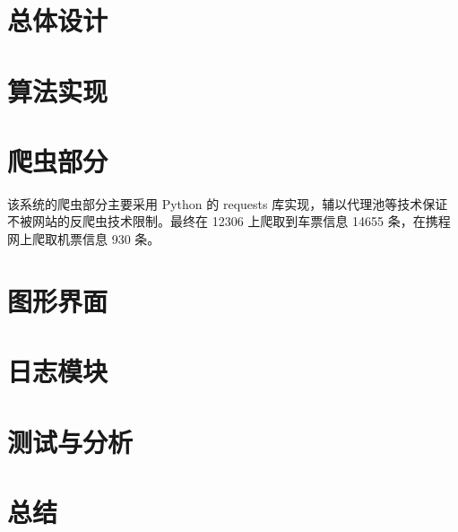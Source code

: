 \documentclass[blue]{elegantbook}
\begin{document}
\chapter{总体设计}

\chapter{算法实现}

\chapter{爬虫部分}
该系统的爬虫部分主要采用 Python 的 requests 库实现，辅以代理池等技术保证不被网站的反爬虫技术限制。最终在 12306 上爬取到车票信息 14655 条，在携程网上爬取机票信息 930 条。

\chapter{图形界面}

\chapter{日志模块}

\chapter{测试与分析}

\chapter{总结}
\end{document}
